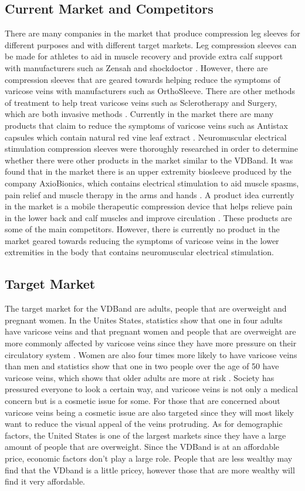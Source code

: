 \documentclass[11.5pt]{article}
\begin{document}
\subsection{Current Market and Competitors}
There are many companies in the market that produce compression leg sleeves for different purposes and with different target markets. Leg compression sleeves can be made for athletes to aid in muscle recovery and provide extra calf support with manufacturers such as Zensah and shockdoctor \cite{Zensah}. However, there are compression sleeves that are geared towards helping reduce the symptoms of varicose veins with manufacturers such as OrthoSleeve. There are other methods of treatment to help treat varicose veins such as Sclerotherapy and Surgery, which are both invasive methods \cite{Mayo}. Currently in the market there are many products that claim to reduce the symptoms of varicose veins such as Antistax capsules which contain natural red vine leaf extract \cite{Antisatax}. Neuromuscular electrical stimulation compression sleeves were thoroughly researched in order to determine whether there were other products in the market similar to the VDBand. It was found that in the market there is an upper extremity biosleeve produced by the company AxioBionics, which contains electrical stimulation to aid muscle spasms, pain relief and muscle therapy in the arms and hands \cite{Axio}. A product idea currently in the market is a mobile therapeutic compression device that helps relieve pain in the lower back and calf muscles and improve circulation \cite{ACBJ}. These products are some of the main competitors. However, there is currently no product in the market geared towards reducing the symptoms of varicose veins in the lower extremities in the body that contains neuromuscular electrical stimulation. 

\subsection{Target Market}
The target market for the VDBand are adults, people that are overweight and pregnant women. In the Unites States, statistics show that one in four adults have varicose veins and that pregnant women and people that are overweight are more commonly affected by varicose veins since they have more pressure on their circulatory system \cite{MedNews}. Women are also four times more likely to have varicose veins than men and statistics show that one in two people over the age of 50 have varicose veins, which shows that older adults are more at risk \cite{Healthy}. Society has pressured everyone to look a certain way, and varicose veins is not only a medical concern but is a cosmetic issue for some. For those that are concerned about varicose veins being a cosmetic issue are also targeted since they will most likely want to reduce the visual appeal of the veins protruding. As for demographic factors, the United States is one of the largest markets since they have a large amount of people that are overweight. Since the VDBand is at an affordable price, economic factors don't play a large role. People that are less wealthy may find that the VDband is a little pricey, however those that are more wealthy will find it very affordable.   
\end{document}
